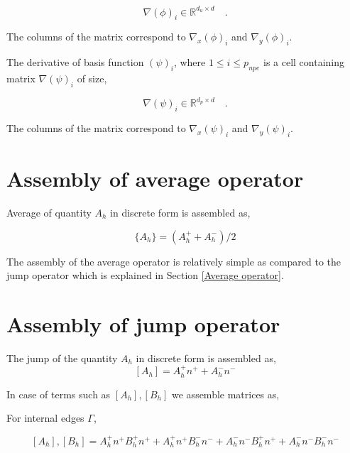 \documentclass[a4paper]{book}
\begin{document}
\begin{equation}\label{basis_func_derivative_velocity_rbmatlab}
\nabla (\phi)_{i} \in \mathbb{R}^{{d_u} \times d} \quad \textrm{.}
\end{equation}

The columns of the matrix correspond to $\nabla_x (\phi)_{i}$ and $\nabla_y (\phi)_{i}$.

The derivative of basis function $(\psi)_{i}$, where $1 \leq i \leq p_{npe}$ is a cell containing matrix $\nabla (\psi)_{i}$ of size,

\begin{equation}\label{basis_func_derivative_pressure_rbmatlab}
\nabla (\psi)_{i} \in \mathbb{R}^{{d_p} \times d} \quad \textrm{.}
\end{equation}

The columns of the matrix correspond to $\nabla_x (\psi)_{i}$ and $\nabla_y (\psi)_{i}$.

\section{Assembly of average operator}

Average of quantity $A_h$ in discrete form is assembled as,

\begin{equation}\label{Average operator}
\lbrace A_h \rbrace = (A_h^+ + A_h^-)/2
\end{equation}

The assembly of the average operator is relatively simple as compared to the jump operator which is explained in Section \ref{Average operator}.

\section{Assembly of jump operator} \label{Jump operator}

The jump of the quantity $A_h$ in discrete form is assembled as,
\begin{equation} \label{Jump_operator}
[A_h] = A_h^+ n^+ + A_h^- n^-
\end{equation}

In case of terms such as $[A_h],[B_h]$ we assemble matrices as, 

For internal edges $\Gamma$,

\begin{equation} \label{Jump operator L2}
[A_h],[B_h] = A_h^+ n^+ B_h^+ n^+ + A_h^+ n^+ B_h^- n^- + A_h^- n^- B_h^+ n^+ + A_h^- n^- B_h^- n^-
\end{equation}
\end{document}
